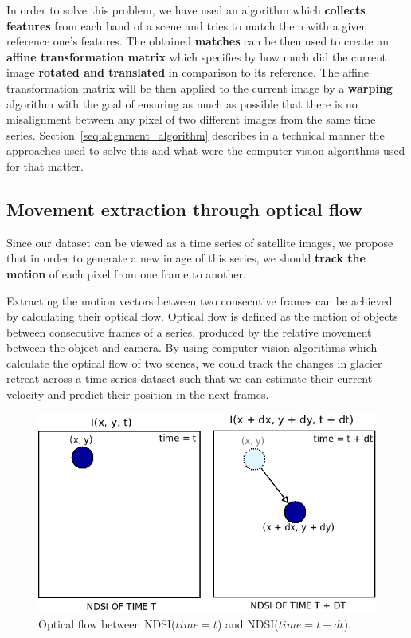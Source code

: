 \documentclass[12pt, a4paper]{report}
\begin{document}
	\par In order to solve this problem, we have used an algorithm which \textbf{collects features} from each band of a scene and tries to match them with a given reference one's features. The obtained \textbf{matches} can be then used to create an \textbf{affine transformation matrix} which specifies by how much did the current image \textbf{rotated and translated} in comparison to its reference. The affine transformation matrix will be then applied to the current image by a \textbf{warping} algorithm with the goal of ensuring as much as possible that there is no misalignment between any pixel of two different images from the same time series. Section~\ref{seq:alignment_algorithm} describes in a technical manner the approaches used to solve this and what were the computer vision algorithms used for that matter. 

	\subsection{Movement extraction through optical flow}
	\label{seq:ndsi_motion_matrix}
	
	\par Since our dataset can be viewed as a time series of satellite images, we propose that in order to generate a new image of this series, we should \textbf{track the motion} of each pixel from one frame to another.
	
	\par Extracting the motion vectors between two consecutive frames can be achieved by
	calculating their optical flow. Optical flow is defined as the motion of objects between
	consecutive frames of a series, produced by the relative movement between the object
	and camera. By using computer vision algorithms which calculate the optical flow of two
	scenes, we could track the changes in glacier retreat across a time series dataset such that we can estimate
	their current velocity and predict their position in the next frames.
	
	\begin{figure}[h]
		\centering
		\includegraphics[width=\columnwidth]{../images/optical_flow_schema.png}
		\caption{Optical flow between NDSI(\(time=t\)) and NDSI(\(time=t+dt\)).}
		\label{fig:optical_flow_schema}
	\end{figure}
	
\end{document}
